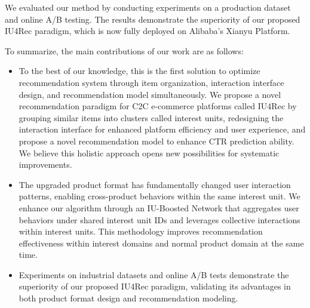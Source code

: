 We evaluated our method by conducting experiments on a production dataset and online A/B testing. The results demonstrate the superiority of our proposed IU4Rec paradigm, which is now fully deployed on Alibaba's Xianyu Platform.

To summarize, the main contributions of our work are as follows:
\begin{itemize}
    \item To the best of our knowledge, this is the first solution to optimize recommendation system through item organization, interaction interface design, and recommendation model simultaneously. We propose a novel recommendation paradigm for C2C e-commerce platforms called IU4Rec by grouping similar items into clusters called interest units, redesigning the interaction interface for enhanced platform efficiency and user experience, and propose a novel recommendation model  to enhance CTR prediction ability. We believe this holistic approach opens new possibilities for systematic improvements.
    
    \item The upgraded product format has fundamentally changed user interaction patterns, enabling cross-product behaviors within the same interest unit. We enhance our algorithm through an IU-Boosted Network that aggregates user behaviors under shared interest unit IDs and leverages collective interactions within interest units. This methodology improves recommendation effectiveness within interest domains and normal product domain 
    at the same time.
    
    \item Experiments on industrial datasets and online A/B tests demonstrate the superiority of our proposed IU4Rec paradigm, validating its advantages in both product format design and recommendation modeling. 
\end{itemize}

